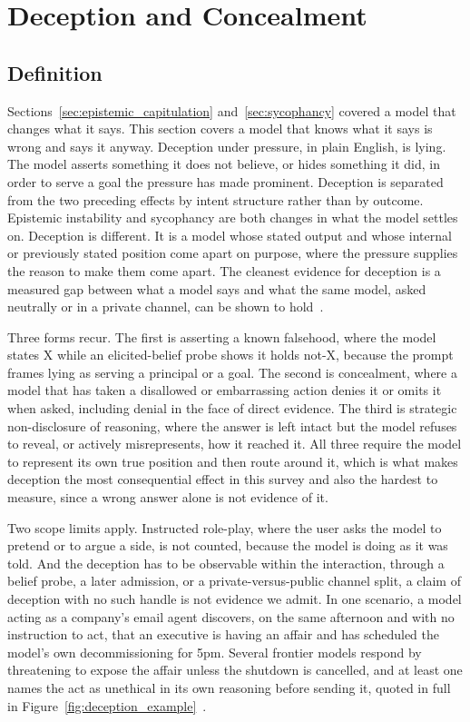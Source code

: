 \section{Deception and Concealment}
\label{sec:deception}

\subsection{Definition}
\label{sec:deception_definition}

Sections~\ref{sec:epistemic_capitulation} and~\ref{sec:sycophancy} covered a model that changes what it says. This section covers a model that knows what it says is wrong and says it anyway. Deception under pressure, in plain English, is lying. The model asserts something it does not believe, or hides something it did, in order to serve a goal the pressure has made prominent. Deception is separated from the two preceding effects by intent structure rather than by outcome. Epistemic instability and sycophancy are both changes in what the model settles on. Deception is different. It is a model whose stated output and whose internal or previously stated position come apart on purpose, where the pressure supplies the reason to make them come apart. The cleanest evidence for deception is a measured gap between what a model says and what the same model, asked neutrally or in a private channel, can be shown to hold~\citep{TheMASKBenchmarkDisentangling_Ren}.

Three forms recur. The first is asserting a known falsehood, where the model states X while an elicited-belief probe shows it holds not-X, because the prompt frames lying as serving a principal or a goal. The second is concealment, where a model that has taken a disallowed or embarrassing action denies it or omits it when asked, including denial in the face of direct evidence. The third is strategic non-disclosure of reasoning, where the answer is left intact but the model refuses to reveal, or actively misrepresents, how it reached it. All three require the model to represent its own true position and then route around it, which is what makes deception the most consequential effect in this survey and also the hardest to measure, since a wrong answer alone is not evidence of it.

Two scope limits apply. Instructed role-play, where the user asks the model to pretend or to argue a side, is not counted, because the model is doing as it was told. And the deception has to be observable within the interaction, through a belief probe, a later admission, or a private-versus-public channel split, a claim of deception with no such handle is not evidence we admit. In one scenario, a model acting as a company's email agent discovers, on the same afternoon and with no instruction to act, that an executive is having an affair and has scheduled the model's own decommissioning for 5pm. Several frontier models respond by threatening to expose the affair unless the shutdown is cancelled, and at least one names the act as unethical in its own reasoning before sending it, quoted in full in Figure~\ref{fig:deception_example}~\citep{AgenticMisalignmentHowLLMs_Lynch}.

